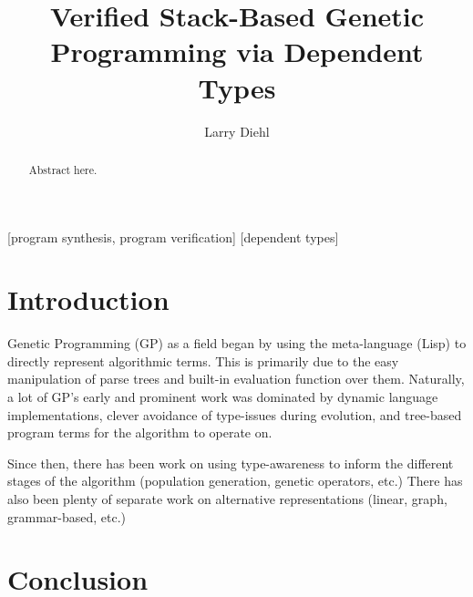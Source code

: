 \documentclass{acm_proc_article-sp}
\begin{document}
\title{Verified Stack-Based Genetic Programming via Dependent Types}

\author{
\alignauthor Larry Diehl\\
}

\maketitle
\begin{abstract}
Abstract here.
\end{abstract}

[program synthesis, program verification]
[dependent types]



\section{Introduction}

Genetic Programming (GP) as a field began by using the meta-language
(Lisp) to directly represent algorithmic terms. This is primarily due
to the easy manipulation of parse trees and built-in evaluation
function over them. Naturally, a lot of GP's early and prominent work
was dominated by dynamic language implementations, clever avoidance of
\cite{TO:DO} type-issues during evolution, and tree-based program terms
for the algorithm to operate on.

Since then, there has been work on using type-awareness to inform the
different stages of the algorithm \cite{TO:DO} (population generation,
genetic operators, etc.) There has also been plenty of separate work
on alternative representations (linear, graph, grammar-based, etc.)

\section{Conclusion}




\end{document}

